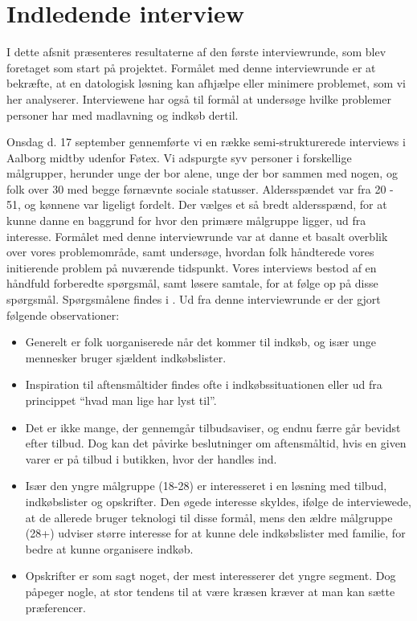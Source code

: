 \section{Indledende interview}\label{section:interview1}
I dette afsnit præsenteres resultaterne af den første interviewrunde, som blev foretaget som start på projektet.
Formålet med denne interviewrunde er at bekræfte, at en datologisk løsning kan afhjælpe eller minimere problemet, som vi her analyserer.
Interviewene har også til formål at undersøge hvilke problemer personer har med madlavning og indkøb dertil.

Onsdag d. 17 september gennemførte vi en række semi-strukturerede interviews i Aalborg midtby udenfor Føtex.
Vi adspurgte syv personer i forskellige målgrupper, herunder unge der bor alene, unge der bor sammen med nogen, og folk over 30 med begge førnævnte sociale statusser.
Aldersspændet var fra 20 - 51, og kønnene var ligeligt fordelt.
Der vælges et så bredt aldersspænd, for at kunne danne en baggrund for hvor den primære målgruppe ligger, ud fra interesse.
Formålet med denne interviewrunde var at danne et basalt overblik over vores problemområde, samt undersøge, hvordan folk håndterede vores initierende problem på nuværende tidspunkt.
Vores interviews bestod af en håndfuld forberedte spørgsmål, samt løsere samtale, for at følge op på disse spørgsmål.
Spørgsmålene findes i .
Ud fra denne interviewrunde er der gjort følgende observationer:
\begin{itemize}
	\item Generelt er folk uorganiserede når det kommer til indkøb, og især unge mennesker bruger sjældent indkøbslister.
	\item Inspiration til aftensmåltider findes ofte i indkøbssituationen eller ud fra princippet “hvad man lige har lyst til”.
	\item Det er ikke mange, der gennemgår tilbudsaviser, og endnu færre går bevidst efter tilbud.
	Dog kan det påvirke beslutninger om aftensmåltid, hvis en given varer er på tilbud i butikken, hvor der handles ind.
	\item Især den yngre målgruppe (18-28) er interesseret i en løsning med tilbud, indkøbslister og opskrifter. Den øgede interesse skyldes, ifølge de interviewede, at de allerede bruger teknologi til disse formål, mens den ældre målgruppe (28+) udviser større interesse for at kunne dele indkøbslister med familie, for bedre at kunne organisere indkøb.
	\item Opskrifter er som sagt noget, der mest interesserer det yngre segment.
	Dog påpeger nogle, at stor tendens til at være kræsen kræver at man kan sætte præferencer.
\end{itemize}

